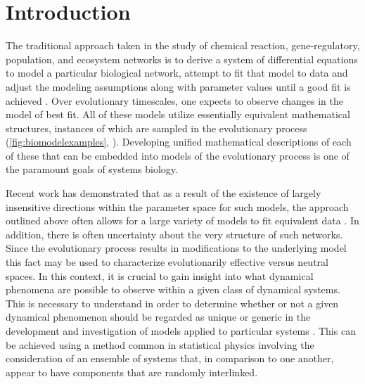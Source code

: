 \section{Introduction}

The traditional approach taken in the study of chemical reaction, gene-regulatory, population, and ecosystem networks is to derive a system of differential equations to model a particular biological network, attempt to fit that model to data and adjust the modeling assumptions along with parameter values until a good fit is achieved \cite{Meyer2014}. Over evolutionary timescales, one expects to observe changes in the model of best fit. All of these models utilize essentially equivalent mathematical structures, instances of which are sampled in the evolutionary process (\ref{fig:biomodelexamples}, \cite{RossCr2003,Palsson2011a,Sauro2012}). Developing unified mathematical descriptions of each of these that can be embedded into models of the evolutionary process is one of the paramount goals of systems biology.

Recent work has demonstrated that as a result of the existence of largely insensitive directions within the parameter space for such models, the approach outlined above often allows for a large variety of models to fit equivalent data \cite{Machta2013,Hines2014,Prabakaran2014,Tonsing2014}. In addition, there is often uncertainty about the very structure of such networks. Since the evolutionary process results in modifications to the underlying model this fact may be used to characterize evolutionarily effective versus neutral spaces. In this context, it is crucial to gain insight into what dynamical phenomena are possible to observe within a given class of dynamical systems. This is necessary to understand in order to determine whether or not a given dynamical phenomenon should be regarded as unique or generic in the development and investigation of models applied to particular systems \cite{Gunawardena2013,Gunawardena2014}. This can be achieved using a method common in statistical physics involving the consideration of an ensemble of systems that, in comparison to one another, appear to have components that are randomly interlinked.


